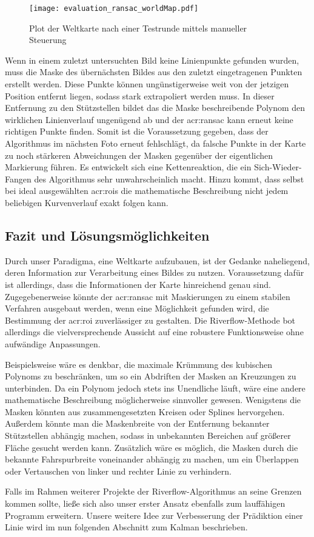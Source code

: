 \begin{figure}[htbp] %
	\centering
	\texttt{[image: evaluation\_ransac\_worldMap.pdf]}
	\caption{Plot der Weltkarte nach einer Testrunde mittels manueller Steuerung}
	\label{evaluation_ransac_weltkarte}
\end{figure} 

Wenn in einem zuletzt untersuchten Bild keine Linienpunkte gefunden wurden, muss die Maske des übernächsten Bildes aus den zuletzt eingetragenen Punkten erstellt werden. Diese Punkte können ungünstigerweise weit von der jetzigen Position entfernt liegen, sodass stark extrapoliert werden muss. In dieser Entfernung zu den Stützstellen bildet das die Maske beschreibende Polynom den wirklichen Linienverlauf ungenügend ab und der \gls{acr:ransac} kann erneut keine richtigen Punkte finden. Somit ist die Voraussetzung gegeben, dass der Algorithmus im nächsten Foto erneut fehlschlägt, da falsche Punkte in der Karte zu noch stärkeren Abweichungen der Masken gegenüber der eigentlichen Markierung führen. Es entwickelt sich eine Kettenreaktion, die ein \glqq Sich-Wieder-Fangen\grqq{} des Algorithmus sehr unwahrscheinlich macht. 
Hinzu kommt, dass selbst bei ideal ausgewählten \glspl{acr:roi} die mathematische Beschreibung nicht jedem beliebigen Kurvenverlauf exakt folgen kann. 


\subsection{Fazit und Lösungsmöglichkeiten}

Durch unser Paradigma, eine Weltkarte aufzubauen, ist der Gedanke naheliegend, deren Information zur Verarbeitung eines Bildes zu nutzen. Voraussetzung dafür ist allerdings, dass die Informationen der Karte hinreichend genau sind. Zugegebenerweise könnte der \gls{acr:ransac} mit Maskierungen zu einem stabilen Verfahren ausgebaut werden, wenn eine Möglichkeit gefunden wird, die Bestimmung der \gls{acr:roi} zuverlässiger zu gestalten. Die Riverflow-Methode bot allerdings die vielversprechende Aussicht auf eine robustere Funktionsweise ohne aufwändige Anpassungen. 

Beispielsweise wäre es denkbar, die maximale Krümmung des kubischen Polynoms zu beschränken, um so ein Abdriften der Masken an Kreuzungen zu unterbinden. Da ein Polynom jedoch stets ins Unendliche läuft, wäre eine andere mathematische Beschreibung möglicherweise sinnvoller gewesen. Wenigstens die Masken könnten aus zusammengesetzten Kreisen oder Splines hervorgehen. Außerdem könnte man die Maskenbreite von der Entfernung bekannter Stützstellen abhängig machen, sodass in unbekannten Bereichen auf größerer Fläche gesucht werden kann. Zusätzlich wäre es möglich, die Masken durch die bekannte Fahrspurbreite voneinander abhängig zu machen, um ein Überlappen oder Vertauschen von linker und rechter Linie zu verhindern.

Falls im Rahmen weiterer Projekte der Riverflow-Algorithmus an seine Grenzen kommen sollte, ließe sich also unser erster Ansatz ebenfalls zum lauffähigen Programm erweitern. Unsere weitere Idee zur Verbesserung der Prädiktion einer Linie wird im nun folgenden Abschnitt zum Kalman beschrieben.

